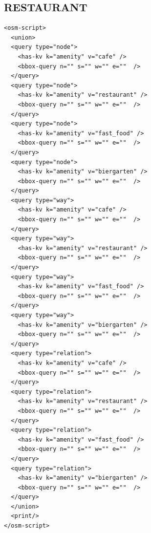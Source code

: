 \documentclass[10pt]{scrreprt}
\begin{document}
\subsection*{RESTAURANT}
\begin{lstlisting} 
<osm-script>
  <union>
  <query type="node">
    <has-kv k="amenity" v="cafe" />
    <bbox-query n="" s="" w="" e=""  />
  </query>
  <query type="node">
    <has-kv k="amenity" v="restaurant" />
    <bbox-query n="" s="" w="" e=""  />
  </query>
  <query type="node">
    <has-kv k="amenity" v="fast_food" />
    <bbox-query n="" s="" w="" e=""  />
  </query>
  <query type="node">
    <has-kv k="amenity" v="biergarten" />
    <bbox-query n="" s="" w="" e=""  />
  </query>
  <query type="way">
    <has-kv k="amenity" v="cafe" />
    <bbox-query n="" s="" w="" e=""  />
  </query>
  <query type="way">
    <has-kv k="amenity" v="restaurant" />
    <bbox-query n="" s="" w="" e=""  />
  </query>
  <query type="way">
    <has-kv k="amenity" v="fast_food" />
    <bbox-query n="" s="" w="" e=""  />
  </query>
  <query type="way">
    <has-kv k="amenity" v="biergarten" />
    <bbox-query n="" s="" w="" e=""  />
  </query>
  <query type="relation">
    <has-kv k="amenity" v="cafe" />
    <bbox-query n="" s="" w="" e=""  />
  </query>
  <query type="relation">
    <has-kv k="amenity" v="restaurant" />
    <bbox-query n="" s="" w="" e=""  />
  </query>
  <query type="relation">
    <has-kv k="amenity" v="fast_food" />
    <bbox-query n="" s="" w="" e=""  />
  </query>
  <query type="relation">
    <has-kv k="amenity" v="biergarten" />
    <bbox-query n="" s="" w="" e=""  />
  </query>
  </union>
  <print/>
</osm-script>
\end{lstlisting}
\end{document}
